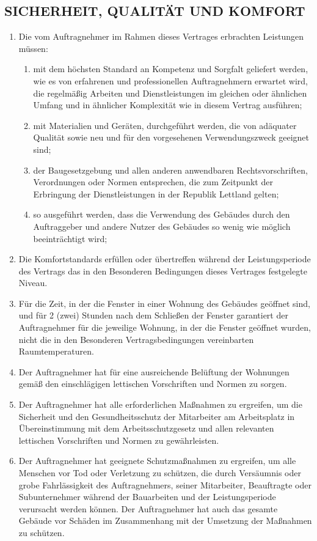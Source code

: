 \begin{multicols}{2}
  \subsection{SICHERHEIT, QUALITÄT UND KOMFORT}
  \begin{enumerate}
    \item Die vom Auftragnehmer im Rahmen dieses Vertrages erbrachten Leistungen müssen:
    \begin{enumerate}
      \item mit dem höchsten Standard an Kompetenz und Sorgfalt geliefert werden, wie es von erfahrenen und professionellen Auftragnehmern erwartet wird, die regelmäßig Arbeiten und Dienstleistungen im gleichen oder ähnlichen Umfang und in ähnlicher Komplexität wie in diesem Vertrag ausführen;
      \item mit Materialien und Geräten, durchgeführt werden, die von adäquater Qualität sowie neu und für den vorgesehenen Verwendungszweck geeignet sind;
      \item der Baugesetzgebung und allen anderen anwendbaren Rechtsvorschriften, Verordnungen oder Normen entsprechen, die zum Zeitpunkt der Erbringung der Dienstleistungen in der Republik Lettland gelten;
      \item so ausgeführt werden, dass die Verwendung des Gebäudes durch den Auftraggeber und andere Nutzer des Gebäudes so wenig wie möglich beeinträchtigt wird;
      \end{enumerate}
   \item Die Komfortstandards erfüllen oder übertreffen während der Leistungsperiode des Vertrags das in den Besonderen Bedingungen dieses Vertrages  festgelegte Niveau.
   \item Für die Zeit, in der die Fenster in einer Wohnung des Gebäudes geöffnet sind, und für 2 (zwei) Stunden nach dem Schließen der Fenster garantiert der Auftragnehmer für die jeweilige Wohnung, in der die Fenster geöffnet wurden, nicht die in den Besonderen Vertragsbedingungen vereinbarten Raumtemperaturen.
   \item Der Auftragnehmer hat für eine ausreichende Belüftung der
Wohnungen gemäß den einschlägigen lettischen Vorschriften und Normen zu sorgen.
   \item Der Auftragnehmer hat alle erforderlichen Maßnahmen zu ergreifen, um die Sicherheit und den Gesundheitsschutz der Mitarbeiter am Arbeitsplatz in Übereinstimmung mit dem Arbeitsschutzgesetz und allen relevanten lettischen Vorschriften und Normen zu gewährleisten.
   \item Der Auftragnehmer hat geeignete Schutzmaßnahmen zu ergreifen, um alle Menschen vor Tod oder Verletzung zu schützen, die durch Versäumnis oder grobe Fahrlässigkeit des Auftragnehmers, seiner Mitarbeiter, Beauftragte oder Subunternehmer während der Bauarbeiten und der Leistungsperiode verursacht werden können. Der Auftragnehmer hat auch das gesamte Gebäude vor Schäden im Zusammenhang mit der Umsetzung der Maßnahmen zu schützen.

\end{enumerate}
\end{multicols}
